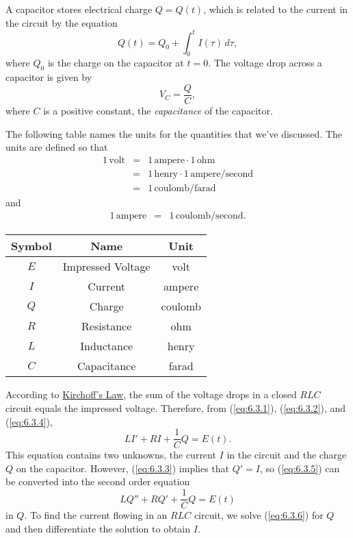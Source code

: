 \documentclass{ximera}
\begin{document}
A capacitor stores electrical charge $Q=Q(t)$, which is related to
the current in the circuit by the equation
\begin{equation} \label{eq:6.3.3}
Q(t)=Q_0+\int_0^tI(\tau)\,d\tau,
\end{equation}
where $Q_0$ is the charge on the capacitor at $t=0$. The voltage drop
across a capacitor is given by
\begin{equation} \label{eq:6.3.4}
V_C=\frac{Q}{C},
\end{equation}
where $C$ is a positive constant, the \textit{capacitance} of the
capacitor.

The following table names the units for the quantities that we've
discussed. The units are defined so that
\begin{eqnarray*}
1\,\mbox{volt}&=&1\,\mbox{ampere}\cdot1\,\mbox{ohm}\\
&=&1\,\mbox{henry}\cdot1\,\mbox{ampere}/\mbox{second}\\
&=&1\,\mbox{coulomb}/\mbox{farad}
\end{eqnarray*}
and
\begin{eqnarray*}
1\,\mbox{ampere}&=&1\,\mbox{coulomb}/\mbox{second}.
\end{eqnarray*}

\begin{center}
\begin{tabular}{|c|c|c|}
\hline
 {\bf Symbol}&{\bf Name}& {\bf Unit}\\\hline
$E$  &  Impressed Voltage & volt  \\\hline
$I$ & Current & ampere \\\hline
$Q$ & Charge & coulomb\\\hline
$R$ & Resistance& ohm\\\hline
$L$ & Inductance& henry\\\hline
$C$ & Capacitance&farad\\\hline
\end{tabular}
\end{center}

According to
\href{http://www-history.mcs.st-and.ac.uk/Mathematicians/Kirchhoff.html}
{Kirchoff's Law}, the sum of
the voltage drops in a closed $RLC$ circuit equals the impressed
voltage. Therefore, from (\ref{eq:6.3.1}), (\ref{eq:6.3.2}), and (\ref{eq:6.3.4}),
\begin{equation} \label{eq:6.3.5}
 LI'+RI+\frac{1}{C}Q=E(t).
\end{equation}
This equation contains two unknowns, the current $I$ in the
circuit and the charge $Q$ on the capacitor. However, (\ref{eq:6.3.3})
implies that $Q'=I$, so (\ref{eq:6.3.5}) can be converted into the second
order equation
\begin{equation} \label{eq:6.3.6}
 LQ''+RQ'+\frac{1}{C}Q=E(t)
\end{equation}
in $Q$. To find the current flowing in an $RLC$ circuit, we solve
(\ref{eq:6.3.6}) for $Q$ and then differentiate the solution to obtain
$I$.
\end{document}
